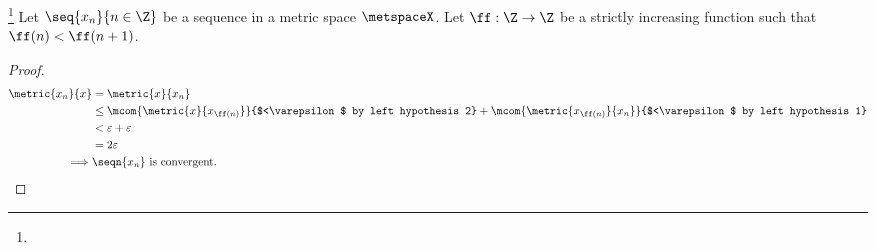 \begin{proposition}
\footnote{
  }
Let $\seq{x_n}{n\in\Z}$ be a sequence in a metric space $\metspaceX$.
Let $\ff:\Z\to\Z$ be a strictly increasing function such that $\ff(n)<\ff(n+1)$.
\end{proposition}
\begin{proof}
\begin{align*}
  \metric{x_n}{x}
    &= \metric{x}{x_n}
  \\&\le \mcom{\metric{x}{x_{\ff(n)}}}{$<\varepsilon$ by left hypothesis 2} + 
         \mcom{\metric{x_{\ff(n)}}{x_n}}{$<\varepsilon$ by left hypothesis 1}
  \\&<   \varepsilon + \varepsilon
  \\&=   2\varepsilon
  \\\implies& \seqn{x_n} \text{ is convergent.}
\end{align*}
\end{proof}

